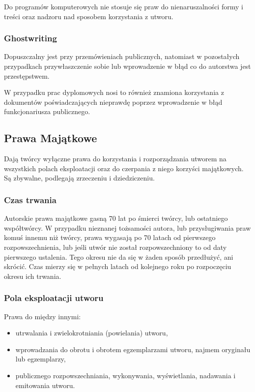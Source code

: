 \documentclass{article}
\begin{document}
Do programów komputerowych nie stosuje się praw do nienaruszalności formy i treści oraz nadzoru nad sposobem korzystania z utworu.

\subsubsection{Ghostwriting}

Dopuszczalny jest przy przemówieniach publicznych, natomiast w pozostałych przypadkach przywłaszczenie sobie lub wprowadzenie w błąd co do autorstwa jest przestępstwem.

W przypadku prac dyplomowych nosi to również znamiona korzystania z dokumentów poświadczających nieprawdę poprzez wprowadzenie w błąd funkcjonariusza publicznego.

\subsection{Prawa Majątkowe}

Dają twórcy wyłączne prawa do korzystania i rozporządzania utworem na wszystkich polach eksploatacji oraz do czerpania z niego korzyści majątkowych. Są zbywalne, podlegają zrzeczeniu i dziedziczeniu.

\subsubsection{Czas trwania}

Autorskie prawa majątkowe gasną 70 lat po śmierci twórcy, lub ostatniego współtwórcy.
W przypadku nieznanej tożsamości autora, lub przysługiwania praw komuś innemu niż twórcy, prawa wygasają po 70 latach od pierwszego rozpowszechnienia, lub jeśli utwór nie został rozpowszechniony to od daty pierwszego ustalenia. Tego okresu nie da się w żaden sposób przedłużyć, ani skrócić. Czas mierzy się w pełnych latach od kolejnego roku po rozpoczęciu okresu ich trwania.

\subsubsection{Pola eksploatacji utworu}

Prawa do między innymi:
\begin{itemize}
  \item utrwalania i zwielokrotniania (powielania) utworu,
  \item wprowadzania do obrotu i obrotem egzemplarzami utworu, najmem oryginału lub egzemplarzy,
  \item publicznego rozpowszechniania, wykonywania, wyświetlania, nadawania i emitowania utworu.
\end{itemize}
\end{document}

